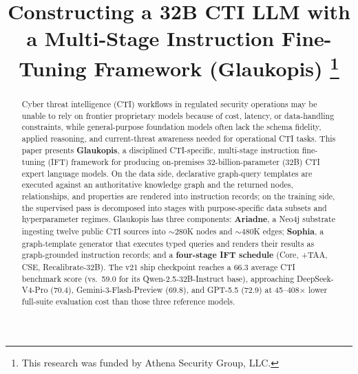 \documentclass[conference]{IEEEtran}
\begin{document}
\title{Constructing a 32B CTI LLM with a Multi-Stage Instruction Fine-Tuning Framework (Glaukopis)
\thanks{This research was funded by Athena Security Group, LLC.}
}

\author{%
%
}

\maketitle

\begin{abstract}
Cyber threat intelligence (CTI) workflows in regulated security operations may be unable to rely on frontier proprietary models because of cost, latency, or data-handling constraints, while general-purpose foundation models often lack the schema fidelity, applied reasoning, and current-threat awareness needed for operational CTI tasks. This paper presents \textbf{Glaukopis}, a disciplined CTI-specific, multi-stage instruction fine-tuning (IFT) framework for producing on-premises 32-billion-parameter (32B) CTI expert language models. On the data side, declarative graph-query templates are executed against an authoritative knowledge graph and the returned nodes, relationships, and properties are rendered into instruction records; on the training side, the supervised pass is decomposed into stages with purpose-specific data subsets and hyperparameter regimes. Glaukopis has three components: \textbf{Ariadne}, a Neo4j substrate ingesting twelve public CTI sources into ${\sim}280$K nodes and ${\sim}480$K edges; \textbf{Sophia}, a graph-template generator that executes typed queries and renders their results as graph-grounded instruction records; and a \textbf{four-stage IFT schedule} (Core, +TAA, CSE, Recalibrate-32B). The v21 ship checkpoint reaches a 66.3 average CTI benchmark score (vs.\ 59.0 for its Qwen-2.5-32B-Instruct base), approaching DeepSeek-V4-Pro (70.4), Gemini-3-Flash-Preview (69.8), and GPT-5.5 (72.9) at 45--408$\times$ lower full-suite evaluation cost than those three reference models.
\end{abstract}
\end{document}
